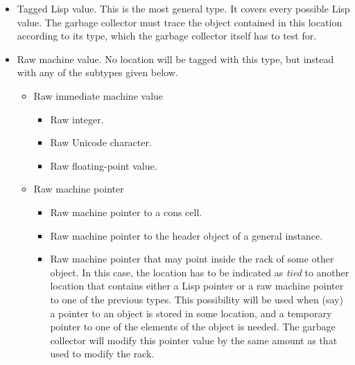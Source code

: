 \begin{itemize}
\item Tagged Lisp value.  This is the most general type.  It covers
  every possible Lisp value.  The garbage collector must trace the
  object contained in this location according to its type, which the
  garbage collector itself has to test for. 
\item Raw machine value.  No location will be tagged with this type,
  but instead with any of the subtypes given below.
  \begin{itemize}
  \item Raw immediate machine value
    \begin{itemize}
      \item Raw integer.
      \item Raw Unicode character.
      \item Raw floating-point value.
    \end{itemize}
  \item Raw machine pointer
    \begin{itemize}
    \item Raw machine pointer to a cons cell.  
    \item Raw machine pointer to the header object of a general
      instance.
    \item Raw machine pointer that may point inside the rack
      of some other object. In this case, the location has to
      be indicated as \emph{tied} to another location that contains
      either a Lisp pointer or a raw machine pointer to one of the
      previous types.  This possibility will be used when (say) a
      pointer to an object is stored in some location, and a temporary
      pointer to one of the elements of the object is needed.  The
      garbage collector will modify this pointer value by the same
      amount as that used to modify the rack. 
    \end{itemize}
  \end{itemize}
\end{itemize}

